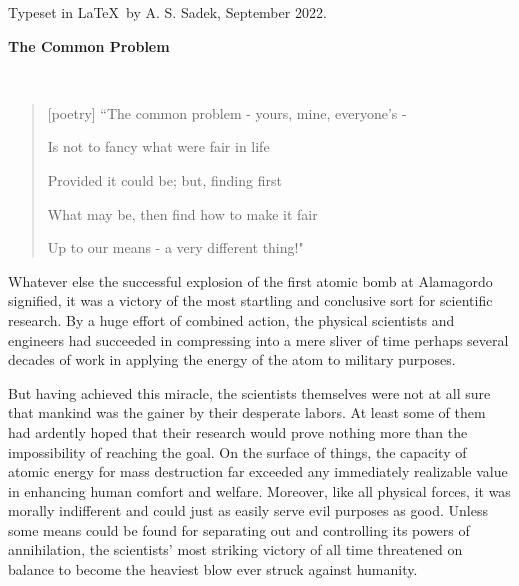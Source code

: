 \acknowledgments
Typeset in \LaTeX~by A. S. Sadek, September 2022.



\begin{introduction}

\vspace{-25pt}

{\huge \textbf{The Common Problem}}

\vspace{40pt}

\\

\vspace{-17pt}
\begin{quote}[poetry]
\raggedleft
``The common problem - yours, mine, everyone's -

Is not to fancy what were fair in life

Provided it could be; but, finding first

What may be, then find how to make it fair

Up to our means - a very different thing!"
\end{quote}

\vspace{10pt}

Whatever else the successful explosion of the first atomic bomb at Alamagordo signified, it was a victory of the most startling and conclusive sort for scientific research. By a huge effort of combined action, the physical scientists and engineers had succeeded in compressing into a mere sliver of time perhaps several decades of work in applying the energy of the atom to military purposes.

But having achieved this miracle, the scientists themselves were not at all sure that mankind was the gainer by their desperate labors. At least some of them had ardently hoped that their research would prove nothing more than the impossibility of reaching the goal. On the surface of things, the capacity of atomic energy for mass destruction far exceeded any immediately realizable value in enhancing human comfort and welfare. Moreover, like all physical forces, it was morally indifferent and could just as easily serve evil purposes as good. Unless some means could be found for separating out and controlling its powers of annihilation, the scientists' most striking victory of all time threatened on balance to become the heaviest blow ever struck against humanity.


\end{introduction}
